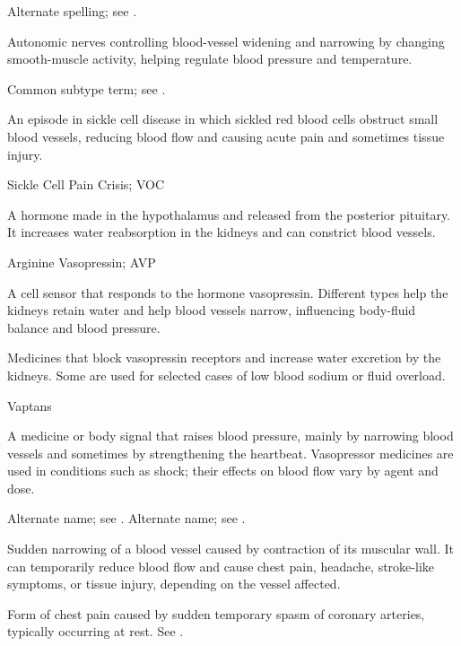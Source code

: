  Alternate spelling; see .

 Autonomic nerves controlling blood-vessel widening and narrowing by changing smooth-muscle activity, helping regulate blood pressure and temperature.

 Common subtype term; see .

 An episode in sickle cell disease in which sickled red blood cells obstruct small blood vessels, reducing blood flow and causing acute pain and sometimes tissue injury.

\synonyms
Sickle Cell Pain Crisis; VOC

 A hormone made in the hypothalamus and released from the posterior pituitary. It increases water reabsorption in the kidneys and can constrict blood vessels.

\synonyms
Arginine Vasopressin; AVP

 A cell sensor that responds to the hormone vasopressin. Different types help the kidneys retain water and help blood vessels narrow, influencing body-fluid balance and blood pressure.

 Medicines that block vasopressin receptors and increase water excretion by the kidneys. Some are used for selected cases of low blood sodium or fluid overload.

\synonyms
Vaptans

 A medicine or body signal that raises blood pressure, mainly by narrowing blood vessels and sometimes by strengthening the heartbeat. Vasopressor medicines are used in conditions such as shock; their effects on blood flow vary by agent and dose.

 Alternate name; see .
 Alternate name; see .

 Sudden narrowing of a blood vessel caused by contraction of its muscular wall. It can temporarily reduce blood flow and cause chest pain, headache, stroke-like symptoms, or tissue injury, depending on the vessel affected.

 Form of chest pain caused by sudden temporary spasm of coronary arteries, typically occurring at rest. See .

